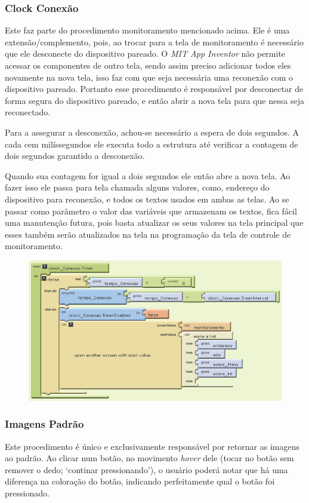 \documentclass[portugues, brazil, a4paper,12pt]{article}
\begin{document}
\subsubsection{Clock Conexão}
Este faz parte do procedimento monitoramento mencionado acima. Ele é uma extensão/complemento, pois, ao trocar para a tela de monitoramento é necessário que ele desconecte do dispositivo pareado. O \textit{MIT App Inventor} não permite acessar os componentes de outro tela, sendo assim preciso adicionar todos eles novamente na nova tela, isso faz com que seja necessária uma reconexão com o dispositivo pareado. Portanto esse procedimento é responsável por desconectar de forma segura do dispositivo pareado, e então abrir a nova tela para que nessa seja reconectado.

Para a assegurar a desconexão, achou-se necessário a espera de dois segundos. A cada cem milíssegundos ele executa todo a estrutura até verificar a contagem de dois segundos garantido a desconexão.

Quando sua contagem for igual a dois segundos ele então abre a nova tela. Ao fazer isso ele passa para tela chamada alguns valores, como, endereço do dispositivo para reconexão, e todos os textos usados em ambas as telas. Ao se passar como parâmetro o valor das variáveis que armazenam os textos, fica fácil uma manutenção futura, pois basta atualizar os seus valores na tela principal que esses também serão atualizados na tela na programação da tela de controle de monitoramento.

\begin{figure}[H]
	\centering
	\includegraphics[scale=.8]{img/controle/clockconexao.png}
	
\end{figure}


\subsubsection{Imagens Padrão}
Este procedimento é único e exclusivamente responsável por retornar as imagens ao padrão. Ao clicar num botão, no movimento \textit{hover} dele (tocar no botão sem remover o dedo; `continar pressionando'), o usuário poderá notar que há uma diferença na coloração do botão, indicando perfeitamente qual o botão foi pressionado.
\end{document}
